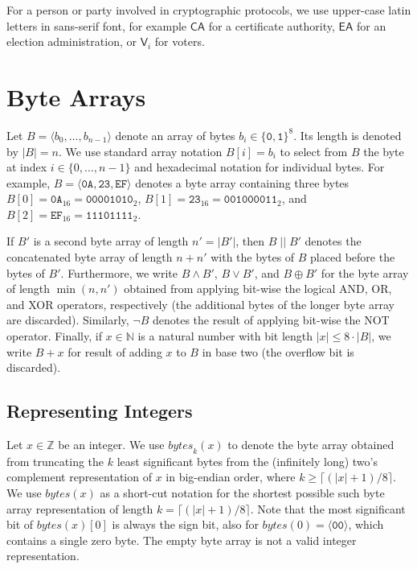 \documentclass[bibtotoc,halfparskip,oneside]{scrreprt}
\newcommand{\hex}[1]{\ensuremath{\mathtt{#1}}}
\newcommand{\HEX}[1]{\ensuremath{\mathtt{#1}_{16}}}
\newcommand{\bin}[1]{\ensuremath{\mathtt{#1}}}
\newcommand{\BIN}[1]{\ensuremath{\mathtt{#1}_{2}}}
\newcommand{\conc}{\ensuremath{\;||\;}}
\newcommand{\CA}{\ensuremath{\mathsf{CA}}\xspace}
\newcommand{\EA}{\ensuremath{\mathsf{EA}}\xspace}
\newcommand{\Voter}[1]{\ensuremath{\mathsf{V}_{#1}}\xspace}
\begin{document}
For a person or party involved in cryptographic protocols, we use upper-case latin letters in sans-serif font, for example \CA for a certificate authority, \EA for an election administration, or \Voter{i} for voters.

\section{Byte Arrays}

Let $B=\langle b_0,\ldots,b_{n-1}\rangle$ denote an array of bytes $b_i\in\{\bin{0},\bin{1}\}^8$. Its length is denoted by $|B|=n$. We use standard array notation $B[i]=b_i$ to select from $B$ the byte at index $i\in\{0,\ldots,n-1\}$ and hexadecimal notation for individual bytes. For example, $B=\langle \hex{0A},\hex{23},\hex{EF}\rangle$ denotes a byte array containing three bytes $B[0]=\HEX{0A}=\BIN{00001010}$, $B[1]=\HEX{23}=\BIN{001000011}$, and $B[2]=\HEX{EF}=\BIN{11101111}$.

If $B'$ is a second byte array of length $n'=|B'|$, then $B\conc B'$ denotes the concatenated byte array of length $n+n'$ with the bytes of $B$ placed before the bytes of $B'$. Furthermore, we write $B\wedge B'$, $B\vee B'$, and $B \oplus B'$ for the byte array of length $\min(n,n')$ obtained from applying bit-wise the logical AND, OR, and XOR operators, respectively (the additional bytes of the longer byte array are discarded). Similarly, $\neg B$ denotes the result of applying bit-wise the NOT operator. Finally, if $x\in\mathbb{N}$ is a natural number with bit length $|x|\leq 8{\cdot}|B|$, we write $B+x$ for result of adding $x$ to $B$ in base two (the overflow bit is discarded).

\subsection{Representing Integers}
Let $x\in \mathbb{Z}$ be an integer. We use $\mathit{bytes}_k(x)$ to denote the byte array obtained from truncating the $k$ least significant bytes from the (infinitely long) two's complement representation of $x$ in big-endian order, where $k\geq \lceil(|x|+1)/8\rceil$. We use $\mathit{bytes}(x)$ as a short-cut notation for the shortest possible such byte array representation of length $k=\lceil(|x|+1)/8\rceil$. Note that the most significant bit of $\mathit{bytes}(x)[0]$ is always the sign bit, also for $\mathit{bytes}(0)=\langle\hex{00}\rangle$, which contains a single zero byte. The empty byte array is not a valid integer representation.
\end{document}
